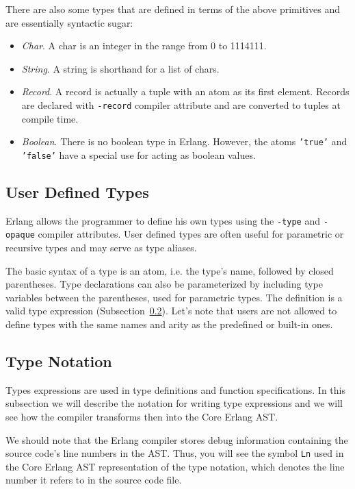 There are also some types that are defined in terms of the above primitives and
are essentially syntactic sugar:

\begin{itemize}
  \item \emph{Char}. A char is an integer in the range from 0 to 1114111.
  \item \emph{String}. A string is shorthand for a list of chars.
  \item \emph{Record}. A record is actually a tuple with an atom as its first
    element. Records are declared with \texttt{-record} compiler attribute and
    are converted to tuples at compile time.
  \item \emph{Boolean}. There is no boolean type in Erlang. However, the atoms
    \texttt{'true'} and \texttt{'false'} have a special use for acting as
    boolean values.
\end{itemize}

\subsection{User Defined Types}\label{sub:userdef_types}

Erlang allows the programmer to define his own types using the \texttt{-type}
and \texttt{-opaque} compiler attributes. User defined types are often useful
for parametric or recursive types and may serve as type aliases.

The basic syntax of a type is an atom, i.e. the type's name, followed by closed
parentheses. Type declarations can also be parameterized by including type
variables between the parentheses, used for parametric types. The definition is
a valid type expression (Subsection~\ref{sub:type_notation}). Let's note that
users are not allowed to define types with the same names and arity as the
predefined or built-in ones.

\subsection{Type Notation}\label{sub:type_notation}

Types expressions are used in type definitions and function specifications. In
this subsection we will describe the notation for writing type expressions and
we will see how the compiler transforms then into the Core Erlang AST.

We should note that the Erlang compiler stores debug information containing the
source code's line numbers in the AST. Thus, you will see the symbol
\texttt{Ln} used in the Core Erlang AST representation of the type notation,
which denotes the line number it refers to in the source code file.

